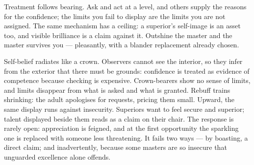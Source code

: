 


\begin{core}
Treatment follows bearing. Ask and act at a level, and others supply the reasons for the confidence; the limits you fail to display are the limits you are not assigned. The same mechanism has a ceiling: a superior's self-image is an asset too, and visible brilliance is a claim against it. Outshine the master and the master survives you --- pleasantly, with a blander replacement already chosen.
\end{core}

\begin{mechanism}
Self-belief radiates like a crown. Observers cannot see the interior, so they infer from the exterior that there must be grounds: confidence is treated as evidence of competence because checking is expensive. Crown-bearers show no sense of limits, and limits disappear from what is asked and what is granted. Rebuff trains shrinking: the adult apologises for requests, pricing them small. Upward, the same display runs against insecurity. Superiors want to feel secure and superior; talent displayed beside them reads as a claim on their chair. The response is rarely open: appreciation is feigned, and at the first opportunity the sparkling one is replaced with someone less threatening. It fails two ways --- by boasting, a direct claim; and inadvertently, because some masters are so insecure that unguarded excellence alone offends.
\end{mechanism}

